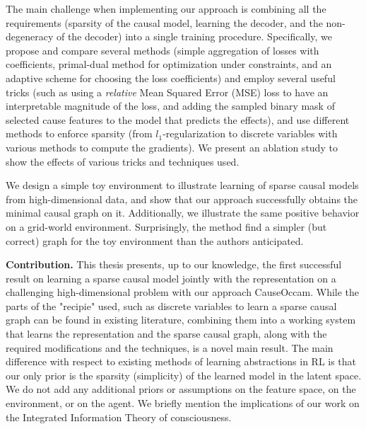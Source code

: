 \documentclass[a4paper,11pt,oneside]{report}
\newcommand{\sysname}{CauseOccam\xspace}
\begin{document}
The main challenge when implementing our approach is combining all the requirements (sparsity of the causal model, learning the decoder, and the non-degeneracy of the decoder) into a single training procedure. Specifically, we propose and compare several methods (simple aggregation of losses with coefficients, primal-dual method for optimization under constraints, and an adaptive scheme for choosing the loss coefficients) and employ several useful tricks (such as using a {\em relative} Mean Squared Error (MSE) loss to have an interpretable magnitude of the loss, and adding the sampled binary mask of selected cause features to the model that predicts the effects), and use different methods to enforce sparsity (from $l_1$-regularization to discrete variables with various methods to compute the gradients). We present an ablation study to show the effects of various tricks and techniques used.

We design a simple toy environment to illustrate learning of sparse causal models from high-dimensional data, and show that our approach successfully obtains the minimal causal graph on it. Additionally, we illustrate the same positive behavior on a grid-world environment. Surprisingly, the method find a simpler (but correct) graph for the toy environment than the authors anticipated.

{\bf Contribution.} This thesis presents, up to our knowledge, the first successful result on learning a sparse causal model jointly with the representation on a challenging high-dimensional problem with our approach \sysname. While the parts of the "recipie" used, such as discrete variables to learn a sparse causal graph can be found in existing literature, combining them into a working system that learns the representation and the sparse causal graph, along with the required modifications and the techniques, is a novel main result. The main difference with respect to existing methods of learning abstractions in RL is that our only prior is the sparsity (simplicity) of the learned model in the latent space. We do not add any additional priors or assumptions on the feature space, on the environment, or on the agent. We briefly mention the implications of our work on the Integrated Information Theory\cite{Tononi2016} of consciousness.
\end{document}
